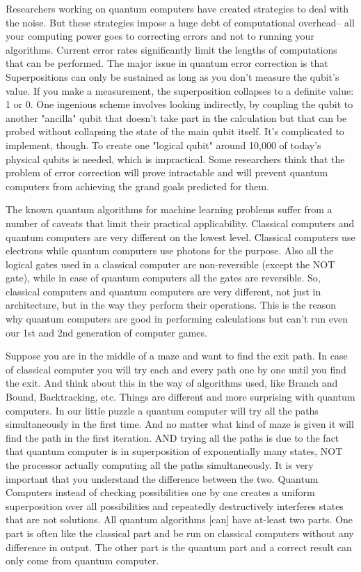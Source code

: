 Researchers working on quantum computers have created strategies to deal with the noise. But these strategies impose a huge debt of computational overhead-- all your computing power goes to correcting errors and not to running your algorithms. Current error rates significantly limit the lengths of computations that can be performed. The major issue in quantum error correction is that Superpositions can only be sustained as long as you don't measure the qubit's value. If you make a measurement, the superposition collapses to a definite value: 1 or 0. One ingenious scheme involves looking indirectly, by coupling the qubit to another "ancilla" qubit that doesn't take part in the calculation but that can be probed without collapsing the state of the main qubit itself. It's complicated to implement, though. To create one "logical qubit" around 10,000 of today's physical qubits is needed, which is impractical. Some researchers think that the problem of error correction will prove intractable and will prevent quantum computers from achieving the grand goals predicted for them.\par\bigskip
The known quantum algorithms for machine learning problems suffer from a number of caveats that limit their practical applicability. Classical computers and quantum computers are very different on the lowest level. Classical computers use electrons while quantum computers use photons for the purpose. Also all the logical gates used in a classical computer are non-reversible (except the NOT gate), while in case of quantum computers all the gates are reversible. So, classical computers and quantum computers are very different, not just in architecture, but in the way they perform their operations. This is the reason why quantum computers are good in performing calculations but can't run even our 1st and 2nd generation of computer games. \par\bigskip
Suppose you are in the middle of a maze and want to find the exit path. In case of classical computer you will try each and every path one by one until you find the exit. And think about this in the way of algorithms used, like Branch and Bound, Backtracking, etc. Things are different and more surprising with quantum computers. In our little puzzle a quantum computer will try all the paths simultaneously in the first time. And no matter what kind of maze is given it will find the path in the first iteration. AND trying all the paths is due to the fact that quantum computer is in superposition of exponentially many states, NOT the processor actually computing all the paths simultaneously. It is very important that you understand the difference between the two. Quantum Computers instead of checking possibilities one by one creates a uniform superposition over all possibilities and repeatedly destructively interferes states that are not solutions. All quantum algorithms [can] have at-least two parts. One part is often like the classical part and be run on classical computers without any difference in output. The other part is the quantum part and a correct result can only come from quantum computer. 
